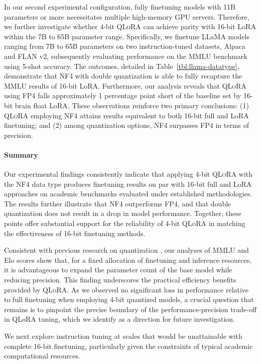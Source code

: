In our second experimental configuration, fully finetuning models with 11B parameters or more necessitates multiple high-memory GPU servers. Therefore, we further investigate whether 4-bit \textsc{QLoRA} can achieve parity with 16-bit LoRA within the 7B to 65B parameter range. Specifically, we finetune LLaMA models ranging from 7B to 65B parameters on two instruction-tuned datasets, Alpaca and FLAN v2, subsequently evaluating performance on the MMLU benchmark using 5-shot accuracy. The outcomes, detailed in Table~\ref{tbl:llama-datatype}, demonstrate that NF4 with double quantization is able to fully recapture the MMLU results of 16-bit LoRA. Furthermore, our analysis reveals that \textsc{QLoRA} using FP4 falls approximately 1 percentage point short of the baseline set by 16-bit brain float LoRA. These observations reinforce two primary conclusions: (1) \textsc{QLoRA} employing NF4 attains results equivalent to both 16-bit full and LoRA finetuning; and (2) among quantization options, NF4 surpasses FP4 in terms of precision.

\paragraph{Summary} Our experimental findings consistently indicate that applying 4-bit \textsc{QLoRA} with the NF4 data type produces finetuning results on par with 16-bit full and LoRA approaches on academic benchmarks evaluated under established methodologies. The results further illustrate that NF4 outperforms FP4, and that double quantization does not result in a drop in model performance. Together, these points offer substantial support for the reliability of 4-bit \textsc{QLoRA} in matching the effectiveness of 16-bit finetuning methods.

Consistent with previous research on quantization \citep{dettmers2022case}, our analyses of MMLU and Elo scores show that, for a fixed allocation of finetuning and inference resources, it is advantageous to expand the parameter count of the base model while reducing precision. This finding underscores the practical efficiency benefits provided by \textsc{QLoRA}. As we observed no significant loss in performance relative to full finetuning when employing 4-bit quantized models, a crucial question that remains is to pinpoint the precise boundary of the performance-precision trade-off in QLoRA tuning, which we identify as a direction for future investigation.

We next explore instruction tuning at scales that would be unattainable with complete 16-bit finetuning, particularly given the constraints of typical academic computational resources.

